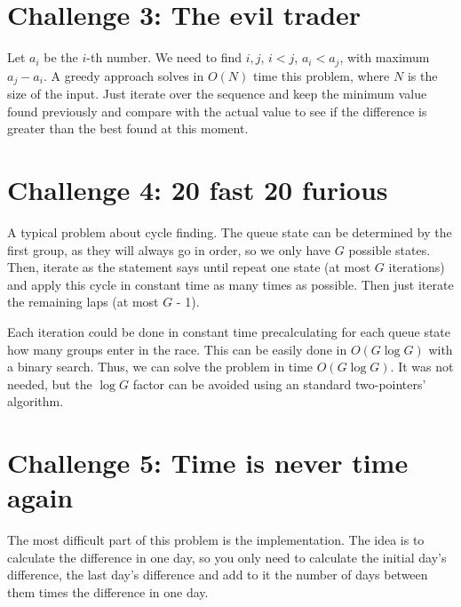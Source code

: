 \documentclass[english,12pt,a4paper]{article}
\begin{document}


\newpage

\section{Challenge 3: The evil trader}
Let $a_i$ be the $i$-th number. We need to find $i,j$, $i < j$, $a_i < a_j$, with maximum $a_j - a_i$. A greedy approach solves in $O(N)$ time this problem, where $N$ is the size of the input. Just iterate over the sequence and keep the minimum value found previously and compare with the actual value to see if the difference is greater than the best found at this moment.



\newpage
\section{Challenge 4: 20 fast 20 furious}
A typical problem about cycle finding. The queue state can be determined by the first group, as they will always go in order, so we only have $G$ possible states. Then, iterate as the statement says until repeat one state (at most $G$ iterations) and apply this cycle in constant time as many times as possible. Then just iterate the remaining laps (at most $G$ - 1). 

Each iteration could be done in constant time precalculating for each queue state how many groups enter in the race. This can be easily done in $O(G\log G)$ with a binary search. Thus, we can solve the problem in time $O(G\log G)$. It was not needed, but the $\log G$ factor can be avoided using an standard two-pointers' algorithm.



\newpage

\section{Challenge 5: Time is never time again}
The most difficult part of this problem is the implementation. The idea is to calculate the difference in one day, so you only need to calculate the initial day's difference, the last day's difference and add to it the number of days between them times the difference in one day.
\end{document}
